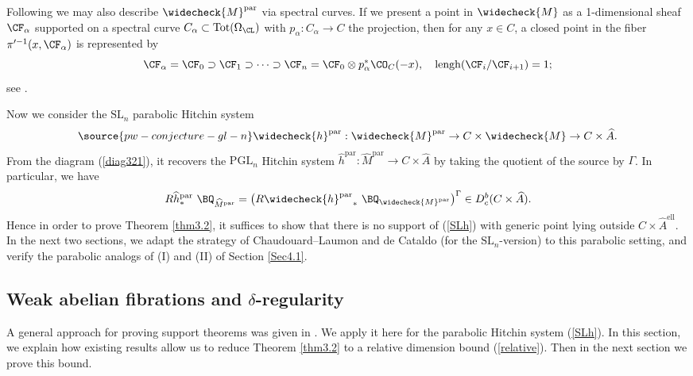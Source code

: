 Following \cite[Example 2.2.5]{Yun1} we may also describe $\widecheck{M}^{\mathrm{par}}$ via spectral curves. If we present a point in $\widecheck{M}$ as a 1-dimensional sheaf $\CF_\alpha$ supported on a spectral curve $C_\alpha \subset \mathrm{Tot}(\Omega_\CL)$ with $p_\alpha: C_\alpha \to C$ the projection, then for any $x\in C$, a closed point in the fiber $\pi'^{-1}(x, \CF_\alpha)$ is represented by
\[
\CF_\alpha = \CF_0 \supset \CF_1 \supset \cdots \supset \CF_n = \CF_0\otimes p_\alpha^* \CO_C(-x), \quad \mathrm{lengh}(\CF_i/\CF_{i+1}) = 1;
\]
see \cite[(2.4)]{Yun1}.

Now we consider the $\mathrm{SL}_n$ parabolic Hitchin system
\begin{equation}\label{SLh}
\source{pw-conjecture-gl-n}
\widecheck{h}^{\mathrm{par}}: \widecheck{M}^{\mathrm{par}} \to C\times \widecheck{M} \to C\times \widehat{A}.
\end{equation}
From the diagram (\ref{diag321}), it recovers the $\mathrm{PGL}_n$ Hitchin system $\widehat{h}^{\mathrm{par}}: \widehat{M}^{\mathrm{par}} \to C \times \widehat{A}$ by taking the quotient of the source by $\Gamma$. In particular, we have
\[
R{\widehat{h}^{\mathrm{par}}}_* ~\BQ_{\widehat{M}^{\mathrm{par}}} = \left(R{\widecheck{h}^{\mathrm{par}}}_* ~\BQ_{\widecheck{M}^{\mathrm{par}}}\right)^\Gamma \in D_c^b(C\times \widehat{A}).
\]
Hence in order to prove Theorem \ref{thm3.2}, it suffices to show that there is no support of (\ref{SLh}) with generic point lying outside $C \times \widehat{A}^{\mathrm{ell}}$. In the next two sections, we adapt the strategy of Chaudouard--Laumon \cite{CL} and de Cataldo \cite{dC_SL} (for the $\mathrm{SL}_n$-version) to this parabolic setting, and verify the parabolic analogs of (I) and (II) of Section \ref{Sec4.1}.




\subsection{Weak abelian fibrations and $\delta$-regularity}

A general approach for proving support theorems was given in \cite[Theorem 1.8]{MS2}. We apply it here for the parabolic Hitchin system (\ref{SLh}). In this section, we explain how existing results allow us to reduce Theorem \ref{thm3.2} to a relative dimension bound (\ref{relative}). Then in the next section we prove this bound.

